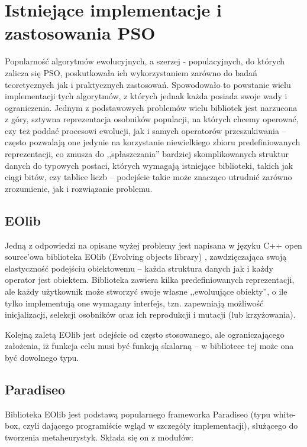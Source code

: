 \documentclass[12pt, twoside, openany, abstract=on]{report}
\theoremstyle{definition}
\begin{document}
\section{Istniejące implementacje i zastosowania PSO}

Popularność algorytmów ewolucyjnych, a szerzej - populacyjnych, do których zalicza się PSO, poskutkowała ich wykorzystaniem zarówno do badań teoretycznych jak i praktycznych zastosowań. Spowodowało to powstanie wielu implementacji tych algorytmów, z których jednak każda posiada swoje wady i ograniczenia. Jednym z podstawowych problemów wielu bibliotek jest narzucona z góry, sztywna reprezentacja osobników populacji, na których chcemy operować, czy też poddać procesowi ewolucji, jak i samych operatorów przeszukiwania – często pozwalają one jedynie na korzystanie niewielkiego zbioru predefiniowanych reprezentacji, co zmusza do ,,spłaszczania'' bardziej skomplikowanych struktur danych do typowych postaci, których wymagają istniejące biblioteki, takich jak ciągi bitów, czy tablice liczb – podejście takie może znacząco utrudnić zarówno zrozumienie, jak i rozwiązanie problemu.


\subsection{EOlib}
Jedną z odpowiedzi na opisane wyżej problemy jest napisana w języku C++ open source’owa biblioteka EOlib (Evolving objects library) \cite{EOlib, EObjGeneral}, zawdzięczająca swoją elastyczność podejściu obiektowemu – każda struktura danych jak i każdy operator jest obiektem. Biblioteka zawiera kilka predefiniowanych reprezentacji, ale każdy użytkownik może stworzyć swoje własne ,,ewoluujące obiekty'', o ile tylko implementują one wymagany interfejs, tzn. zapewniają możliwość inicjalizacji, selekcji osobników oraz ich reprodukcji i mutacji (lub krzyżowania). 

Kolejną zaletą EOlib jest odejście od często stosowanego, ale ograniczającego założenia, iż funkcja celu musi być funkcją skalarną – w bibliotece tej może ona być dowolnego typu.

\subsection{Paradiseo}

Biblioteka EOlib jest podstawą popularnego frameworka Paradiseo \cite{Paradiseo, ParadiseoFramework} (typu white-box, czyli dającego programiście wgląd w szczegóły implementacji), służącego do tworzenia metaheurystyk. Składa się on z modułów: 
\end{document}

